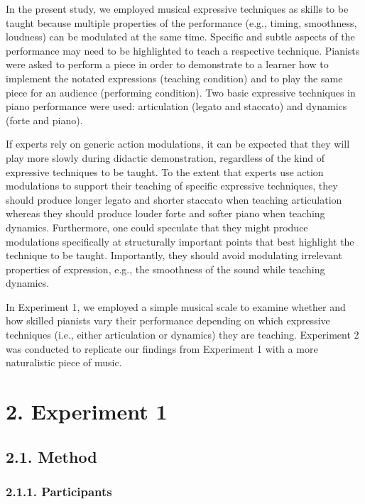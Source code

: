 \documentclass[
  english,
  man,floatsintext]{apa6}
\begin{document}
In the present study, we employed musical expressive techniques as skills to be taught because multiple properties of the performance (e.g., timing, smoothness, loudness) can be modulated at the same time. Specific and subtle aspects of the performance may need to be highlighted to teach a respective technique. Pianists were asked to perform a piece in order to demonstrate to a learner how to implement the notated expressions (teaching condition) and to play the same piece for an audience (performing condition). Two basic expressive techniques in piano performance were used: articulation (legato and staccato) and dynamics (forte and piano).

If experts rely on generic action modulations, it can be expected that they will play more slowly during didactic demonstration, regardless of the kind of expressive techniques to be taught. To the extent that experts use action modulations to support their teaching of specific expressive techniques, they should produce longer legato and shorter staccato when teaching articulation whereas they should produce louder forte and softer piano when teaching dynamics. Furthermore, one could speculate that they might produce modulations specifically at structurally important points that best highlight the technique to be taught. Importantly, they should avoid modulating irrelevant properties of expression, e.g., the smoothness of the sound while teaching dynamics.

In Experiment 1, we employed a simple musical scale to examine whether and how skilled pianists vary their performance depending on which expressive techniques (i.e., either articulation or dynamics) they are teaching. Experiment 2 was conducted to replicate our findings from Experiment 1 with a more naturalistic piece of music.

\hypertarget{experiment-1}{%
\section{2. Experiment 1}\label{experiment-1}}

\hypertarget{method}{%
\subsection{2.1. Method}\label{method}}

\hypertarget{participants}{%
\subsubsection{2.1.1. Participants}\label{participants}}
\end{document}
